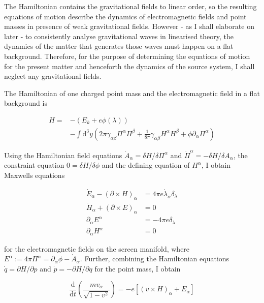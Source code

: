 \documentclass[11pt]{article}
\begin{document}
The Hamiltonian contains the gravitational fields to linear order, so the resulting equations of motion describe the dynamics of electromagnetic fields and point masses in presence of weak gravitational fields. However - as I shall elaborate on later - to consistently analyse gravitational waves in linearised theory, the dynamics of the matter that generates those waves must happen on a flat background. Therefore, for the purpose of determining the equations of motion for the present matter and henceforth the dynamics of the source system, I shall neglect any gravitational fields. 

The Hamiltonian of one charged point mass and the electromagnetic field in a flat background is

\begin{equation}
\begin{split}
		H = &- \left(E_k + e \phi \left( \lambda \right) \right)\\
		&- \int \mathrm{d}^3 y \left( 2 \pi \gamma_{\alpha \beta} \Pi^\alpha \Pi^\beta + \frac{1}{8 \pi}\gamma_{\alpha \beta} H^\alpha H^\beta
		+ \phi \partial_\alpha \Pi^\alpha \right)
\end{split}
\end{equation}

Using the Hamiltonian field equations $\dot{A}_\alpha = \delta H / \delta \Pi^\alpha$ and $\dot{\Pi}^\alpha = -\delta H / \delta A_\alpha$,  the constraint equation $0 = \delta H / \delta \phi$ and the defining equation of $H^\alpha$,  I obtain Maxwells equations

\begin{align}
	\dot{E}_\alpha - \left(\partial \times H \right)_\alpha &= 4 \pi e 
	\dot{\lambda}_\alpha \delta_\lambda\\
		\dot{H}_\alpha +  \left( \partial \times E \right)_\alpha &= 0
		\label{eom_em_2} \\
	\partial_\alpha E^\alpha &= - 4 \pi e \delta_\lambda
	\label{eom_em_3} \\ 
	\partial_\alpha H^\alpha &= 0
\end{align}

for the electromagnetic fields on the screen manifold, where $E^\alpha := 4 \pi \Pi^\alpha = \partial_\alpha \phi - \dot{A}_\alpha $. Further, combining the Hamiltonian equations $\dot{q} = \partial H / \partial p$ and $\dot{p} = - \partial H / \partial q$ for the point mass, I obtain 

\begin{equation}
	\frac{\mathrm{d}}{\mathrm{d}t} 
	\left( \frac{m v_\alpha}{\sqrt{1 - v^2 }}\right)
	= -e \left[ \left(v \times H \right)_\alpha + E_\alpha \right] 
\end{equation} 
\end{document}
